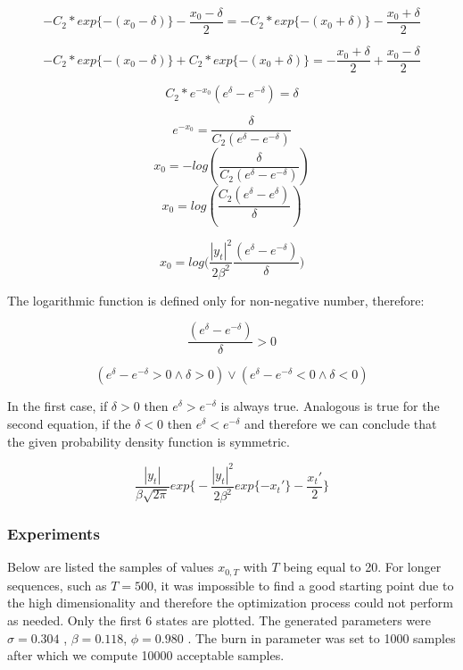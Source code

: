 \documentclass[]{article}
\begin{document}
$$ -C_2 * exp\{-(x_0 - \delta) \} - \frac{x_0 - \delta}{2} = -C_2 * exp\{-(x_0 + \delta) \} - \frac{x_0 + \delta}{2} $$


$$ -C_2 * exp\{-(x_0 - \delta) \} + C_2 * exp\{-(x_0 + \delta) \} =  - \frac{x_0 + \delta}{2} + \frac{x_0 - \delta}{2}  $$

$$ C_2 *  e^{-x_0} ( e^{ \delta} - e^{ -\delta } ) = \delta $$


$$ e^{-x_0}  =  \frac{\delta}{C_2( e^{ \delta} - e^{ -\delta } )} $$
$$ x_0 =  - log(\frac{\delta}{C_2( e^{ \delta} - e^{ -\delta } )} ) $$
$$ x_0 =  log(\frac{C_2( e^{\delta } - e^{ \delta}   )}{ \delta} ) $$

$$ x_0 =  log\Big( \frac{|y_t|^2}{2 \beta^2} \frac{( e^{ \delta} - e^{ -\delta }   )}{ \delta} \Big) $$

The logarithmic function is defined only for non-negative number, therefore:

$$ \frac{( e^{ \delta} - e^{ -\delta }   )}{ \delta} > 0 $$ 

$$ ( e^{ \delta} - e^{ -\delta } > 0 \land \delta >0 ) \lor ( e^{ \delta} - e^{ -\delta } < 0 \land \delta <0 )$$


In the first case, if $\delta >0$ then $ e^\delta > e^{-\delta} $ is always true. Analogous is true for the second equation, if the $\delta <0$ then $ e^\delta < e^{-\delta} $ and therefore we can conclude that the given probability density function is symmetric.

$$\frac{|y_t|}{\beta \sqrt{2 \pi}} exp \bigg\{ -\frac{|y_t|^2}{2 \beta^2} exp\{-x_t' \} - \frac{x_t'}{2} \bigg\}$$

\subsubsection*{Experiments}

Below are listed the samples of values $x_{0,T}$ with $T$ being equal to 20. For longer sequences, such as $T=500$, it was impossible to find a good starting point due to the high dimensionality and therefore the optimization process could not perform as needed. Only the first 6 states are plotted. The generated parameters were $\sigma = 0.304 $ , $\beta = 0.118 $, $\phi = 0.980 $ . The burn in parameter was set to 1000 samples after which we compute 10000 acceptable samples.
\end{document}
